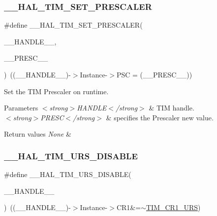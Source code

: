 \subsubsection{\texorpdfstring{\_\_HAL\_TIM\_SET\_PRESCALER}{\_\_HAL\_TIM\_SET\_PRESCALER}}
{\footnotesize\ttfamily \#define \+\_\+\+\_\+\+H\+A\+L\+\_\+\+T\+I\+M\+\_\+\+S\+E\+T\+\_\+\+P\+R\+E\+S\+C\+A\+L\+ER(\begin{DoxyParamCaption}\item[{}]{\+\_\+\+\_\+\+H\+A\+N\+D\+L\+E\+\_\+\+\_\+,  }\item[{}]{\+\_\+\+\_\+\+P\+R\+E\+S\+C\+\_\+\+\_\+ }\end{DoxyParamCaption})~((\+\_\+\+\_\+\+H\+A\+N\+D\+L\+E\+\_\+\+\_\+)-\/$>$Instance-\/$>$P\+SC = (\+\_\+\+\_\+\+P\+R\+E\+S\+C\+\_\+\+\_\+))}



Set the T\+IM Prescaler on runtime. 


\begin{DoxyParams}{Parameters}
{\em $<$strong$>$\+H\+A\+N\+D\+L\+E$<$/strong$>$} & T\+IM handle. \\
\hline
{\em $<$strong$>$\+P\+R\+E\+S\+C$<$/strong$>$} & specifies the Prescaler new value. \\
\hline
\end{DoxyParams}

\begin{DoxyRetVals}{Return values}
{\em None} & \\
\hline
\end{DoxyRetVals}
\mbox{\label{group___t_i_m___exported___macros_gafacb551a4c537e62a0fe740b2f12236c}} 
\subsubsection{\texorpdfstring{\_\_HAL\_TIM\_URS\_DISABLE}{\_\_HAL\_TIM\_URS\_DISABLE}}
{\footnotesize\ttfamily \#define \+\_\+\+\_\+\+H\+A\+L\+\_\+\+T\+I\+M\+\_\+\+U\+R\+S\+\_\+\+D\+I\+S\+A\+B\+LE(\begin{DoxyParamCaption}\item[{}]{\+\_\+\+\_\+\+H\+A\+N\+D\+L\+E\+\_\+\+\_\+ }\end{DoxyParamCaption})~((\+\_\+\+\_\+\+H\+A\+N\+D\+L\+E\+\_\+\+\_\+)-\/$>$Instance-\/$>$C\+R1\&=$\sim$\mbox{\hyperlink{group___peripheral___registers___bits___definition_ga06c997c2c23e8bef7ca07579762c113b}{T\+I\+M\+\_\+\+C\+R1\+\_\+\+U\+RS}})}



